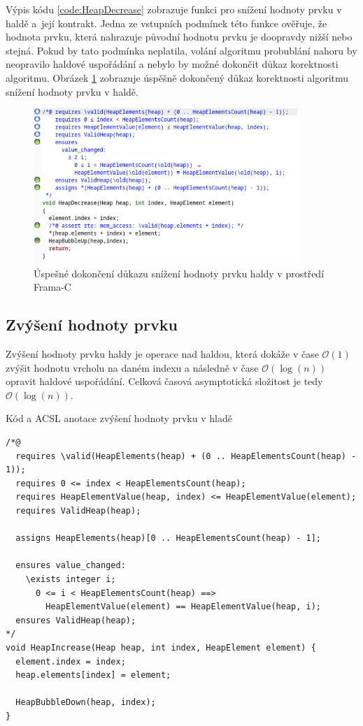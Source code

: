 Výpis kódu \ref{code:HeapDecrease} zobrazuje funkci pro snížení hodnoty prvku v haldě a~její kontrakt. Jedna ze vstupních podmínek této funkce ověřuje, že hodnota prvku, která nahrazuje původní hodnotu prvku je doopravdy nižší nebo stejná. Pokud by tato podmínka neplatila, volání algoritmu probublání nahoru by neopravilo haldové uspořádání a nebylo by možné dokončit důkaz korektnosti algoritmu. Obrázek \ref{img:F-C-HeapDecrease} zobrazuje úspěšně dokončený důkaz korektnosti algoritmu snížení hodnoty prvku v haldě.

\begin{figure}[H]
	\centering
	\includegraphics[width=10cm]{images/frama-c-HeapDecrease}
	\caption{Úspešné dokončení důkazu snížení hodnoty prvku haldy v prostředí Frama-C}
	\label{img:F-C-HeapDecrease}
\end{figure}


\subsection{Zvýšení hodnoty prvku}
\label{subsec:HeapIncrease}

Zvýšení hodnoty prvku haldy je operace nad haldou, která dokáže v čase $\mathcal{O}(1)$ zvýšit hodnotu vrcholu na daném indexu a následně v čase $\mathcal{O}(\log(n))$ opravit haldové uspořádání. Celková časová asymptotická složitost je tedy $\mathcal{O}(\log(n))$.

\begin{listing}[H]
	\caption{Kód a ACSL anotace zvýšení hodnoty prvku v hladě}
	\label{code:HeapIncrease}
	\begin{verbatim}
/*@
  requires \valid(HeapElements(heap) + (0 .. HeapElementsCount(heap) - 1));
  requires 0 <= index < HeapElementsCount(heap);
  requires HeapElementValue(heap, index) <= HeapElementValue(element);
  requires ValidHeap(heap);

  assigns HeapElements(heap)[0 .. HeapElementsCount(heap) - 1];

  ensures value_changed:
    \exists integer i;
      0 <= i < HeapElementsCount(heap) ==>
        HeapElementValue(element) == HeapElementValue(heap, i);
  ensures ValidHeap(heap);
*/
void HeapIncrease(Heap heap, int index, HeapElement element) {
  element.index = index;
  heap.elements[index] = element;

  HeapBubbleDown(heap, index);
}
	\end{verbatim}
\end{listing}

